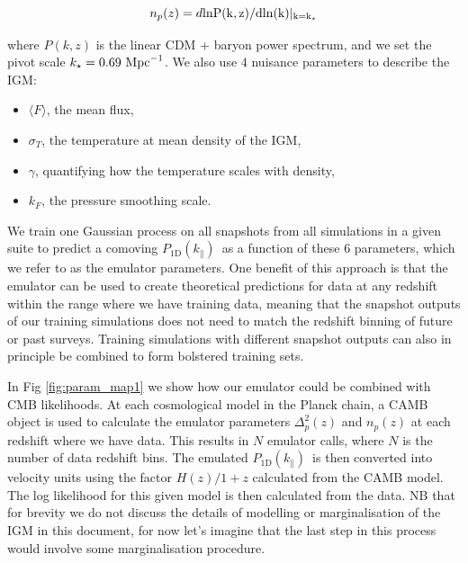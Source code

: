 \documentclass[preprintnumbers,prd,superscriptaddress,notitlepage,nofootinbib] {revtex4-1}
\newcommand{\afr}[1]{{\color{red}AFR: #1}}
\newcommand{\fluxpower}{$P_\mathrm{1D}(k_\parallel)$}
\begin{document}

\begin{equation}
    \label{eq:n_p}
    n_p(z)=d\rm{ln}P(k,z) / d \rm{ln}(k)|_{k=k_\star}
\end{equation}

where $P(k,z)$ is the linear CDM + baryon power spectrum, and we set the pivot
scale $k_\star=0.69 \ \text{Mpc}^{-1}$. We also use $4$ nuisance parameters
to describe the IGM:

\begin{itemize}
    \item $\langle F \rangle$, the mean flux,
    \item $\sigma_T$, the temperature at mean density of the IGM,
    \item $\gamma$, quantifying how the temperature scales with density,
    \item $k_F$, the pressure smoothing scale.
\end{itemize}

We train one Gaussian
process on all snapshots from all simulations in a given suite to predict a
comoving \fluxpower\ as a function of these $6$ parameters, which we refer to as the
emulator parameters. One benefit of this approach is that the emulator can be used
to create theoretical predictions for data at any redshift within the range where
we have training data, meaning that the snapshot outputs of our training simulations
does not need to match the redshift binning of future or past surveys.
Training simulations with different snapshot outputs can also in principle be combined
to form bolstered training sets.

In Fig \ref{fig:param_map1} we show how our emulator could be combined with
CMB likelihoods. At each cosmological model in the Planck chain, a \textsc{CAMB}
object is used to calculate the emulator parameters $\Delta^2_p(z)$ and $n_p(z)$
at each redshift where we have data. This results in $N$ emulator calls, where $N$
is the number of data redshift bins. The emulated \fluxpower\ is then converted
into velocity units using the factor $H(z)/1+z$ calculated from
the \textsc{CAMB} model. The log likelihood for this given model is then calculated
from the data. NB that for brevity we do not discuss the details of modelling or
marginalisation of the IGM in this document, for now let's imagine that the last
step in this process would involve some marginalisation procedure.
\end{document}
